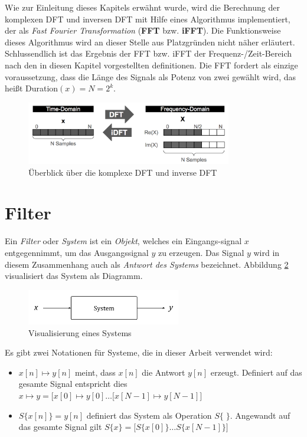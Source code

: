  
Wie zur Einleitung dieses Kapitels erwähnt wurde, wird die Berechnung der komplexen DFT und inversen DFT mit Hilfe eines Algorithmus implementiert, der als \emph{Fast Fourier Transformation} (\textbf{FFT} bzw. \textbf{iFFT}). Die Funktionsweise dieses Algorithmus wird an dieser Stelle aus Platzgründen nicht näher erläutert. Schlussendlich ist das Ergebnis der FFT bzw. iFFT der Frequenz-/Zeit-Bereich nach den in diesen Kapitel vorgestellten definitionen. Die FFT fordert als einzige voraussetzung, dass die Länge des Signals als Potenz von zwei gewählt wird, das heißt Duration$(x) = N = 2^k$. \cite[S. 225 - 226]{dspGuide}

\begin{figure}[h]
	\centering
	\includegraphics[width=0.8\textwidth]{bilder/compDFTOverview.png}
	\caption{Überblick über die komplexe DFT und inverse DFT}
	\label{img:complexDFTOverview}
\end{figure}

\section{Filter}
\label{sec:filter}

Ein \emph{Filter} oder \emph{System} ist ein \emph{Objekt}, welches ein Eingangs-signal $x$ entgegennimmt, um das Ausgangssignal $y$ zu erzeugen. Das Signal $y$ wird in diesem Zusammenhang auch als \emph{Antwort des Systems} bezeichnet. Abbildung \ref{img:system} visualisiert das System als Diagramm.\cite[]{dspMichiganSystems}

\begin{figure}[h]
	\centering
	\includegraphics[width=0.6\textwidth]{bilder/system.png}
	\caption{Visualisierung eines Systems}
	\label{img:system}
\end{figure}

Es gibt zwei Notationen für Systeme, die in dieser Arbeit verwendet wird:
\begin{itemize}
\item $x[n]\mapsto y[n]$ meint, dass $x[n]$ die Antwort $y[n]$ erzeugt. Definiert auf das gesamte Signal entspricht dies $x\mapsto y = \big[x[0]\mapsto y[0] \ldots [x[N-1]\mapsto y[N-1]\big]$
\item $S\{ x[n] \} = y[n]$ definiert das System als Operation $S\{\;\}$. Angewandt auf das gesamte Signal gilt $S\{ x \} = \big[ S\{ x[0] \} \ldots S\{ x[N-1] \} \big] $
\end{itemize}

